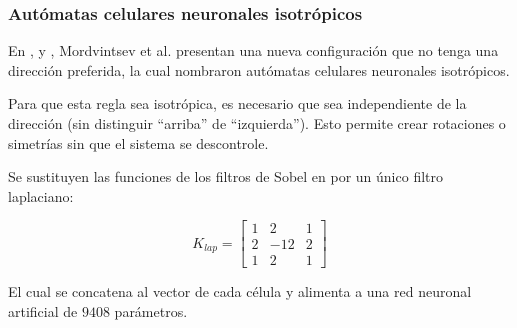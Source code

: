 \subsubsection{Autómatas celulares neuronales isotrópicos}

En \cite{IsoNCA}, \cite{IsoNCA2} y \cite{SteerableNCA}, Mordvintsev et al. presentan una nueva configuración que no tenga una dirección preferida, la cual nombraron autómatas celulares neuronales isotrópicos.

Para que esta regla sea isotrópica, es necesario que sea independiente de la dirección (sin distinguir ``arriba'' de ``izquierda''). Esto permite crear rotaciones o simetrías sin que el sistema se descontrole.

Se sustituyen las funciones de los filtros de Sobel en \cite{mordvintsevNCA} por un único filtro laplaciano:

\[
K_{lap} = \begin{bmatrix}
	
	1 & 2 & 1 \\
	
	2 & -12 & 2 \\
	
	1 & 2 & 1 
	
\end{bmatrix}
\]

El cual se concatena al vector de cada célula y alimenta a una red neuronal artificial de $9408$ parámetros. 

